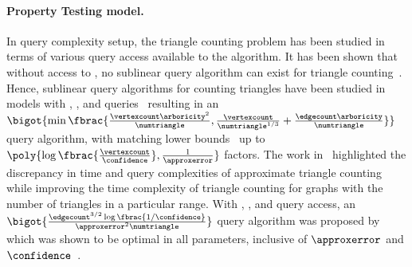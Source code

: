 \paragraph{Property Testing model.}
In query complexity setup, the triangle counting problem has been studied in terms of various query access available to the algorithm. It has been shown that without access to \edgeexistsq{}, no sublinear query algorithm can exist for triangle counting~\citep{GRS11}. Hence, sublinear query algorithms for counting triangles have been studied in models with \degreeq{}, \neighbourq{}, and \edgeexistsq{} queries~\citep{Dana_Ron_Triangle_Counting,DBLP:conf/soda/EdenRS20} resulting in an $\bigot{\min\fbrac{\frac{\vertexcount\arboricity^2}{\numtriangle},\frac{\vertexcount}{\numtriangle^{1/3}}+\frac{\edgecount\arboricity}{\numtriangle}}}$ query algorithm, with matching lower bounds~\citep{Dana_Ron_Triangle_Counting,DBLP:conf/approx/EdenR18,DBLP:conf/soda/EdenRS20} up to $\poly{\log\fbrac{\frac{\vertexcount}{\confidence}},\frac{1}{\approxerror}}$ factors. The work in~\citep{tetek:LIPIcs.ICALP.2022.107} highlighted the discrepancy in time and query complexities of approximate triangle counting while improving the time complexity of triangle counting for graphs with the number of triangles in a particular range. With \randedgeq{}, \neighbourq{}, and \edgeexistsq{} query access, an $\bigot{\frac{\edgecount^{3/2}\log\fbrac{1/\confidence}}{\approxerror^2\numtriangle}}$ query algorithm was proposed by~\citep{assadi2018simple} which was shown to be optimal in all parameters, inclusive of $\approxerror$ and $\confidence$~\citep{DBLP:conf/approx/AssadiN22}.